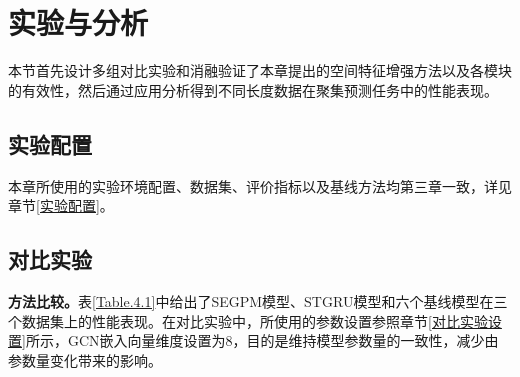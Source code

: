 \documentclass[master]{thesis-uestc}
\begin{document}
\section{实验与分析}
本节首先设计多组对比实验和消融验证了本章提出的空间特征增强方法以及各模块的有效性，然后通过应用分析得到不同长度数据在聚集预测任务中的性能表现。

\subsection{实验配置}
本章所使用的实验环境配置、数据集、评价指标以及基线方法均第三章一致，详见章节\ref{实验配置}。

\subsection{对比实验}
\textbf{方法比较。}表\ref{Table.4.1}中给出了SEGPM模型、STGRU模型和六个基线模型在三个数据集上的性能表现。在对比实验中，所使用的参数设置参照章节\ref{对比实验设置}所示，GCN嵌入向量维度设置为8，目的是维持模型参数量的一致性，减少由参数量变化带来的影响。
\end{document}
